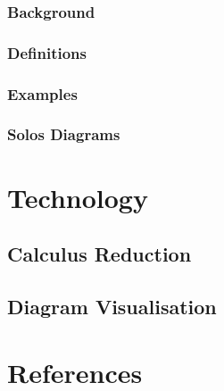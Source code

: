 \documentclass{article}
\begin{document}
        \subsubsection{Background}
            \cite{solo-calculus}
            \cite{acyclic-solos}

        \subsubsection{Definitions}

        \subsubsection{Examples}

        \subsubsection{Solos Diagrams}
            \cite{solo-diagrams}



\section{Technology}

    \subsection{Calculus Reduction}


    \subsection{Diagram Visualisation}



\section{References}

    



\end{document}

